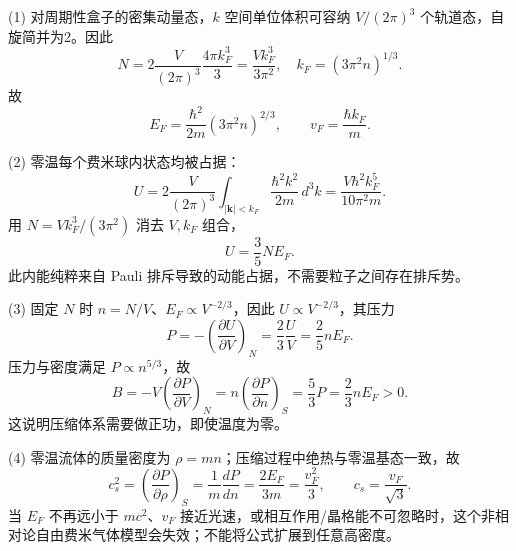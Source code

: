 (1) 对周期性盒子的密集动量态，\(k\) 空间单位体积可容纳 \(V/(2\pi)^3\) 个轨道态，自旋简并为2。因此
\[
N=2\frac{V}{(2\pi)^3}\frac{4\pi k_F^3}{3}
=\frac{Vk_F^3}{3\pi^2},
\quad k_F=(3\pi^2n)^{1/3}.
\]
故
\[
E_F=\frac{\hbar^2}{2m}(3\pi^2n)^{2/3},
\qquad v_F=\frac{\hbar k_F}{m}.
\]

(2) 零温每个费米球内状态均被占据：
\[
U=2\frac V{(2\pi)^3}\int_{|\boldsymbol k|<k_F}
\frac{\hbar^2k^2}{2m}\,d^3k
=\frac{V\hbar^2k_F^5}{10\pi^2m}.
\]
用 \(N=Vk_F^3/(3\pi^2)\) 消去 \(V,k_F\) 组合，
\[
U=\frac35NE_F.
\]
此内能纯粹来自 Pauli 排斥导致的动能占据，不需要粒子之间存在排斥势。

(3) 固定 \(N\) 时 \(n=N/V\)、\(E_F\propto V^{-2/3}\)，因此 \(U\propto V^{-2/3}\)，其压力
\[
P=-\left(\frac{\partial U}{\partial V}\right)_N
=\frac23\frac UV=\frac25nE_F.
\]
压力与密度满足 \(P\propto n^{5/3}\)，故
\[
B=-V\left(\frac{\partial P}{\partial V}\right)_N
=n\left(\frac{\partial P}{\partial n}\right)_{S}
=\frac53P=\frac23nE_F>0.
\]
这说明压缩体系需要做正功，即使温度为零。

(4) 零温流体的质量密度为 \(\rho=mn\)；压缩过程中绝热与零温基态一致，故
\[
c_s^2=\left(\frac{\partial P}{\partial\rho}\right)_S
=\frac1m\frac{dP}{dn}
=\frac{2E_F}{3m}=\frac{v_F^2}{3},
\qquad c_s=\frac{v_F}{\sqrt3}.
\]
当 \(E_F\) 不再远小于 \(mc^2\)、\(v_F\) 接近光速，或相互作用/晶格能不可忽略时，这个非相对论自由费米气体模型会失效；不能将公式扩展到任意高密度。
